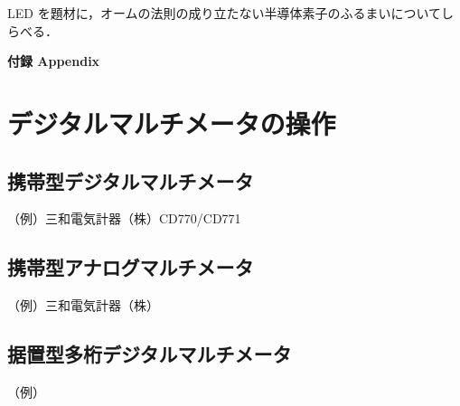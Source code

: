 \documentclass[11pt,sort]{jarticle}
\begin{document}
LED を題材に，オームの法則の成り立たない半導体素子のふるまいについてしらべる．





\newpage
\appendix
\noindent
{\LARGE\bf 付録 Appendix}

\section{デジタルマルチメータの操作}

\subsection{携帯型デジタルマルチメータ}
（例）三和電気計器（株）CD770/CD771

\subsection{携帯型アナログマルチメータ}
（例）三和電気計器（株）

\subsection{据置型多桁デジタルマルチメータ}
（例）
\end{document}

